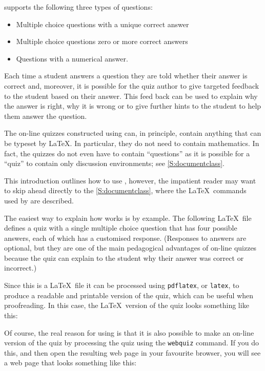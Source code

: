 \documentclass[svgnames]{article}
\begin{document}
    \WebQuiz supports the following three types of questions:
    \begin{itemize}
      \item Multiple choice questions with a unique correct answer
      \item Multiple choice questions zero or more correct answers
      \item Questions with a numerical answer.
    \end{itemize}
    Each time a student answers a question they are told whether their
    answer is correct and, moreover, it is possible for the quiz author
    to give targeted feedback to the student based on their answer. This
    feed back can be used to explain why the answer is right, why it is
    wrong or to give further hints to the student to help them answer the
    question.

    The on-line quizzes constructed using \WebQuiz can, in principle,
    contain anything that can be typeset by \LaTeX. In particular, they
    do not need to contain mathematics. In fact, the quizzes do not even
    have to contain ``questions'' as it is possible for a \WebQuiz
    ``quiz'' to contain only \textsf{discussion} environments; see
    \autoref{S:documentclass}.

    This introduction outlines how to use \WebQuiz, however, the
    impatient reader may want to skip ahead directly to the
    \autoref{S:documentclass}, where the \LaTeX\ commands used by
    \WebQuiz are described.

    The easiest way to explain how \WebQuiz works is by example. The
    following \LaTeX\ file defines a quiz with a single multiple choice
    question that has four possible answers, each of which has a
    customised response.  (Responses to answers are optional, but they
    are one of the main pedagogical advantages of on-line quizzes
    because the quiz can explain to the student why their answer was
    correct or incorrect.)

    

    Since this is a \LaTeX\ file it can be processed using
    \texttt{pdflatex}, or \texttt{latex}, to produce a readable and
    printable version of the quiz, which can be useful when
    proofreading. In this case, the \LaTeX\ version of the quiz looks
    something like this:


    Of course, the real reason for using \WebQuiz is that it is also
    possible to make an on-line version of the quiz by processing the
    quiz using the \texttt{webquiz} command. If you do this, and then open
    the resulting web page in your favourite browser, you will see a web page
    that looks something like this:
\end{document}
